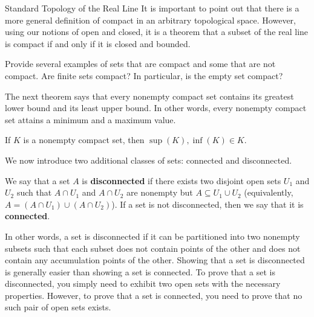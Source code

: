 \begin{section}{Standard Topology of the Real Line}
It is important to point out that there is a more general definition of compact in an arbitrary topological space.  However, using our notions of open and closed, it is a theorem that a subset of the real line is compact if and only if it is closed and bounded.

\begin{problem}
Provide several examples of sets that are compact and some that are not compact. Are finite sets compact? In particular, is the empty set compact?
\end{problem}

The next theorem says that every nonempty compact set contains its greatest lower bound and its least upper bound. In other words, every nonempty compact set attains a minimum and a maximum value.

\begin{theorem}
If $K$ is a nonempty compact set, then $\sup(K),\inf(K)\in K$.
\end{theorem}

We now introduce two additional classes of sets: connected and disconnected. 

\begin{definition}
We say that a set $A$ is \textbf{disconnected} if there exists two disjoint open sets $U_1$ and $U_2$ such that $A\cap U_1$ and $A\cap U_2$ are nonempty but $A\subseteq U_1\cup U_2$ (equivalently, $A=(A\cap U_1)\cup(A\cap U_2)$). If a set is not disconnected, then we say that it is \textbf{connected}.
\end{definition}

In other words, a set is disconnected if it can be partitioned into two nonempty subsets such that each subset does not contain points of the other and does not contain any accumulation points of the other. Showing that a set is disconnected is generally easier than showing a set is connected. To prove that a set is disconnected, you simply need to exhibit two open sets with the necessary properties. However, to prove that a set is connected, you need to prove that no such pair of open sets exists.


\end{section}
